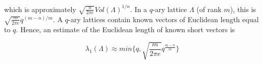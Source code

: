 which is approximately $\sqrt{\frac{n}{2\pi e}} Vol(\Lambda)^{1/n}$.
In a $q$-ary lattice $\Lambda$ (of rank $m$), this is $\sqrt{\frac{m}{2\pi e}}q^{(m-n)/m}$.
A $q$-ary lattices contain known vectors of Euclidean length equal to $q$.
Hence, an estimate of the Euclidean length of known short vectors is

\begin{equation}
    \lambda_1(\Lambda) \approx min \Big\{q,\sqrt{\frac{m}{2\pi e}} q^{\frac{m-n}{m}} \Big\}
\end{equation}


\begin{comment}


In contrast, the vector $\pmb{e}$ has Euclidean length around $\sqrt{m}\delta$
on average and so the vector $(\frac{e}{M})$ has length approximately $\sqrt{2m}\sigma$ when $M = \sqrt{m}\sigma$.
In our experiments we take $M = 1$ and so assume that $\lambda_1(L') \approx \sqrt{m}\sigma$.
Hence the gap is
\begin{equation}
    \gamma(m) = \frac{\lambda_2(L')}{\lambda_1(L')} \approx \frac{min\{q,\frac{1}{\sqrt{\pi}} \Gamma(1+\frac{m}{2})^{\frac{1}{m}}q^{\frac{m-n}{m}}}{\sqrt{m}\sigma} \approx \frac{min\{q, \sqrt{\frac{m}{2\pi e}}q^{\frac{m-n}{m}}\}}{\sqrt{m}\sigma}
\end{equation}
For a successful attack we want this gap to be large, so we will need
\begin{equation}
    \sigma << q^{\frac{m-n}{m}} < \frac{q}{\sqrt{m}}
\end{equation}

To determine whether an LWE instance can be solved using the embedding technique and a lattice reduction algorithm with a given (root) Hermite factor $\delta$, one can choose a suitable subdimension $m$ and verify that the corresponding gap satisfies the condition $\gamma = \gamma(m) > c\delta^m$ for a suitable value $c$.
Since the constant $c$ is unknown, we can maximize $min{q, q^{\frac{m-n}{m}}}/\delta^m$ for fixed $n$, $q$, $\delta$ to get the ``optimal” sub-dimension (which maximizes the success probability of the algorithm) to be
\begin{equation}
    m = \sqrt{\frac{n\log{(q)}}{\log{(\delta)}}}
\end{equation}
where $\delta$ is the Hermite factor of the lattice basis reduction algorithm used.



\end{comment}
